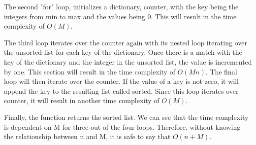 \documentclass[11pt]{article}
\begin{document}
The second "for" loop, initializes a dictionary, counter, with the key being the integers from min to max and the values being 0. This will result in the time complexity of $O(M)$. 

The third loop iterates over the counter again with its nested loop iterating over the unsorted list for each key of the dictionary. Once there is a match with the key of the dictionary and the integer in the unsorted list, the value is incremented by one. This section will result in the time complexity of $O(Mn)$. 
The final loop will then iterate over the counter. If the value of a key is not zero, it will append the key to the resulting list called sorted. Since this loop iterates over counter, it will result in another time complexity of $O(M)$.

Finally, the function returns the sorted list. We can see that the time complexity is dependent on M for three out of the four loops. Therefore, without knowing the relationship between n and M, it is safe to say that $O(n+M)$.


\newpage
\end{document}
